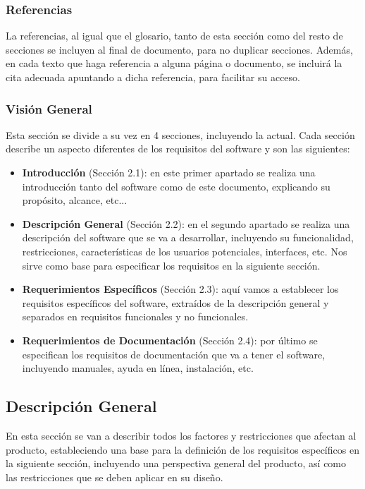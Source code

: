 \subsubsection{Referencias}
La referencias, al igual que el glosario, tanto de esta sección como del resto de secciones se incluyen al final de documento, para no duplicar secciones. Además, en cada texto que haga referencia a alguna página o documento, se incluirá la cita adecuada apuntando a dicha referencia, para facilitar su acceso.


\subsubsection{Visión General}
Esta sección se divide a su vez en 4 secciones, incluyendo la actual. Cada sección describe un aspecto diferentes de los requisitos del software y son las siguientes:

\begin{itemize}
	\item \textbf{Introducción} (Sección 2.1): en este primer apartado se realiza una introducción tanto del software como de este documento, explicando su propósito, alcance, etc...
	
	\item \textbf{Descripción General} (Sección 2.2): en el segundo apartado se realiza una descripción del software que se va a desarrollar, incluyendo su funcionalidad, restricciones, características de los usuarios potenciales, interfaces, etc. Nos sirve como base para especificar los requisitos en la siguiente sección.
	
	\item \textbf{Requerimientos Específicos} (Sección 2.3): aquí vamos a establecer los requisitos específicos del software, extraídos de la descripción general y separados en requisitos funcionales y no funcionales.
	
	\item \textbf{Requerimientos de Documentación} (Sección 2.4): por último se especifican los requisitos de documentación que va a tener el software, incluyendo manuales, ayuda en línea, instalación, etc.
\end{itemize}

\subsection{Descripción General}
En esta sección se van a describir todos los factores y restricciones que afectan al producto, estableciendo una base para la definición de los requisitos específicos en la siguiente sección, incluyendo una perspectiva general del producto, así como las restricciones que se deben aplicar en su diseño.

